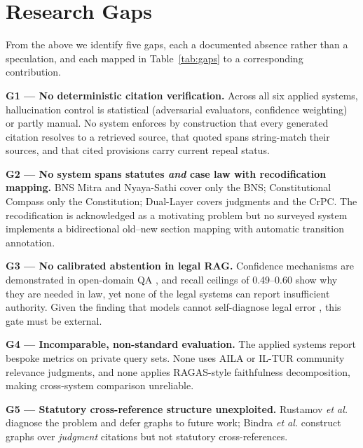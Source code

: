\documentclass[conference]{IEEEtran}
\begin{document}
\section{Research Gaps}

From the above we identify five gaps, each a documented absence rather than a speculation, and each mapped in Table~\ref{tab:gaps} to a corresponding contribution.

\textbf{G1 --- No deterministic citation verification.} Across all six applied systems, hallucination control is statistical (adversarial evaluators, confidence weighting) or partly manual. No system enforces by construction that every generated citation resolves to a retrieved source, that quoted spans string-match their sources, and that cited provisions carry current repeal status.

\textbf{G2 --- No system spans statutes \emph{and} case law with recodification mapping.} BNS Mitra and Nyaya-Sathi cover only the BNS; Constitutional Compass only the Constitution; Dual-Layer covers judgments and the CrPC. The recodification is acknowledged as a motivating problem \cite{dixit2025} but no surveyed system implements a bidirectional old--new section mapping with automatic transition annotation.

\textbf{G3 --- No calibrated abstention in legal RAG.} Confidence mechanisms are demonstrated in open-domain QA \cite{sun2025}, and recall ceilings of 0.49--0.60 \cite{rustamov2025} show why they are needed in law, yet none of the legal systems can report insufficient authority. Given the finding that models cannot self-diagnose legal error \cite{dahl2024}, this gate must be external.

\textbf{G4 --- Incomparable, non-standard evaluation.} The applied systems report bespoke metrics on private query sets. None uses AILA or IL-TUR community relevance judgments, and none applies RAGAS-style faithfulness decomposition, making cross-system comparison unreliable.

\textbf{G5 --- Statutory cross-reference structure unexploited.} Rustamov \textit{et al.} diagnose the problem and defer graphs to future work; Bindra \textit{et al.} construct graphs over \emph{judgment} citations but not statutory cross-references.
\end{document}
